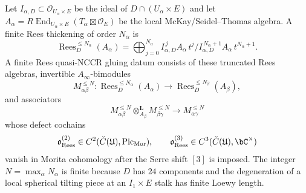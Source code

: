\begin{definition}
\label{def:k3e-finite-rees-gluing}
Let $I_{\alpha,D}\subset\mathcal O_{U_\alpha\times E}$ be the ideal of $D\cap(U_\alpha\times E)$ and let $A_\alpha=R\operatorname{End}_{U_\alpha\times E}(T_\alpha\boxtimes\mathcal O_E)$ be the local McKay/Seidel--Thomas algebra. A finite Rees thickening of order $N_\alpha$ is
\[
\operatorname{Rees}_{D}^{\leq N_\alpha}(A_\alpha)
=
\bigoplus_{j=0}^{N_\alpha} I_{\alpha,D}^{\,j}A_\alpha\,t^j
\Big/
I_{\alpha,D}^{\,N_\alpha+1}A_\alpha\,t^{N_\alpha+1}.
\]
A finite Rees quasi-NCCR gluing datum consists of these truncated Rees algebras, invertible $A_\infty$-bimodules
\[
M_{\alpha\beta}^{\leq N}
\colon
\operatorname{Rees}_{D}^{\leq N_\alpha}(A_\alpha)
\longrightarrow
\operatorname{Rees}_{D}^{\leq N_\beta}(A_\beta),
\]
and associators
\[
M_{\alpha\beta}^{\leq N}\otimes^{\mathbf L}_{A_\beta}
M_{\beta\gamma}^{\leq N}
\longrightarrow
M_{\alpha\gamma}^{\leq N}
\]
whose defect cochains
\[
\mathfrak o_{\mathrm{Rees}}^{(2)}\in C^2(\check C(\mathfrak U),\operatorname{Pic}_{\mathrm{Mor}}),
\qquad
\mathfrak o_{\mathrm{Rees}}^{(3)}\in C^3(\check C(\mathfrak U),\bC^\times)
\]
vanish in Morita cohomology after the Serre shift $[3]$ is imposed. The integer $N=\max_\alpha N_\alpha$ is finite because $D$ has $24$ components and the degeneration of a local spherical tilting piece at an $I_1\times E$ stalk has finite Loewy length.
\end{definition}

